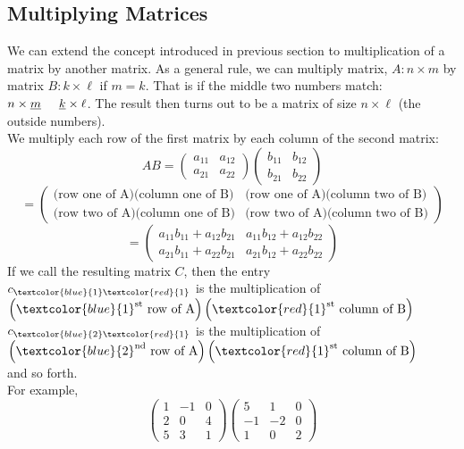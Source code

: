 \documentclass{ximera}
\begin{document}
\subsection{Multiplying Matrices}
We can extend the concept introduced in previous section to multiplication of a matrix by another matrix. As a general rule, we can multiply matrix, $A: n \times m$ by matrix $B: k \times \ell$ if $m=k$. That is if the middle two numbers match: $n\times \underline{m} \hspace{.5cm} \underline{k} \times \ell$. The result then turns out to be a matrix of size $n\times \ell$ (the outside numbers). \\
We multiply each row of the first matrix by each column of the second matrix:
\[ AB = \left(\begin{array}{cc}
a_{11} & a_{12}\\
a_{21} & a_{22}
\end{array}\right) \left(\begin{array}{cc}
b_{11} & b_{12}\\
b_{21} & b_{22}
\end{array}\right)
\]
\[ = \left(\begin{array}{cc}
\text{(row one of A)(column one of B)} & \text{(row one of A)(column two of B)}\\
\text{(row two of A)(column one of B)} & \text{(row two of A)(column two of B)}
\end{array}\right) \]
\[ = \left(\begin{array}{cc}
a_{11}b_{11} + a_{12}b_{21} & a_{11}b_{12}+ a_{12}b_{22}\\
a_{21}b_{11} + a_{22}b_{21} & a_{21}b_{12} + a_{22}b_{22}
\end{array}\right)\]
If we call the resulting matrix $C$, then the entry \\
$c_{\textcolor{blue}{1}\textcolor{red}{1}}$ is the multiplication of $\left(\textcolor{blue}{1}^{\text{st}} \text{ row of A}\right)\left( \textcolor{red}{1}^{\text{st}} \text{ column of B}\right)$\\
$c_{\textcolor{blue}{2} \textcolor{red}{1}}$ is the multiplication of $\left(\textcolor{blue}{2}^{\text{nd}} \text{ row of A}\right)\left( \textcolor{red}{1}^{\text{st}} \text{ column of B}\right)$\\
and so forth. \\
For example,
\[\left(\begin{array}{ccc}
1 & -1 & 0\\
2 & 0 & 4 \\
5 & 3 & 1
\end{array}\right) \left(\begin{array}{ccc}
5 & 1 & 0\\
-1 & -2 & 0\\
1 & 0 & 2
\end{array}\right)\]
\end{document}
